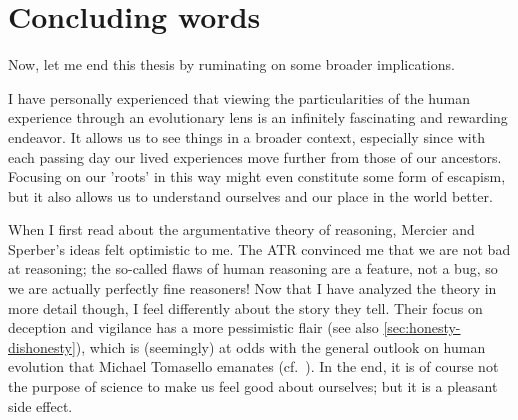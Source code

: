 \section{Concluding words}
Now, let me end this thesis by ruminating on some broader implications.

I have personally experienced that viewing the particularities of the human experience through an evolutionary lens is an infinitely fascinating and rewarding endeavor. It allows us to see things in a broader context, especially since with each passing day our lived experiences move further from those of our ancestors. Focusing on our 'roots' in this way might even constitute some form of escapism, but it also allows us to understand ourselves and our place in the world better.

When I first read about the argumentative theory of reasoning, Mercier and Sperber's ideas felt optimistic to me. The ATR convinced me that we are not bad at reasoning; the so-called flaws of human reasoning are a feature, not a bug, so we are actually perfectly fine reasoners!
Now that I have analyzed the theory in more detail though, I feel differently about the story they tell. Their focus on deception and vigilance has a more pessimistic flair (see also \cref{sec:honesty-dishonesty}), which is (seemingly) at odds with the general outlook on human evolution that Michael Tomasello emanates (cf.~\citet{Tomasello09}). In the end, it is of course not the purpose of science to make us feel good about ourselves; but it is a pleasant side effect.
